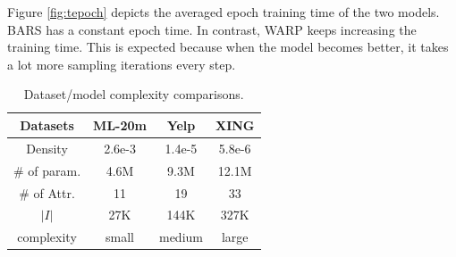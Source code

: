 \documentclass[letterpaper]{article} %
\newcommand{\tepoch}{T$_{epoch}$}
\newcommand{\tconv}{T$_{conv}$}
\newcommand{\lightfm}{\textsc{LightFM}}
\newcommand{\xing}{\textsf{XING}}
\newcommand{\yelp}{\textsf{Yelp}}
\newcommand{\movietwenty}{\textsf{ML-20m}}
\begin{document}
Figure \ref{fig:tepoch} depicts the averaged epoch training time of the two models. BARS has a constant epoch time. In contrast, WARP keeps increasing the training time. This is expected because when the model becomes better, it takes a lot more sampling iterations every step.

\begin{table}[t]
\centering
\begin{tabular}{|c||c|c|c|} \hline
\textbf{Datasets} & \movietwenty & \yelp & \xing \\ \hline
 Density & 2.6e-3 & 1.4e-5 & 5.8e-6 \\ \hline
 \# of param. & 4.6M & 9.3M & 12.1M \\ \hline
 \# of Attr.      & 11     & 19     & 33 \\ \hline
$\left| I \right|$  & 27K &144K & 327K \\ \hline \hline
complexity    & small & medium & large \\ \hline
\end{tabular}
\caption{Dataset/model complexity comparisons.}
\label{t:time}
\end{table}
\end{document}

